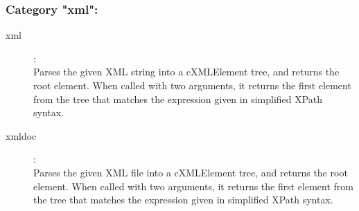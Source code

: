 \subsubsection{Category "xml":}
\label{sec:ned-functions:category-xml}

\begin{description}
\item[xml]:  \\
    Parses the given XML string into a cXMLElement tree, and returns the root element. When called with two arguments, it returns the first element from the tree that matches the expression given in simplified XPath syntax.
\item[xmldoc]:  \\
    Parses the given XML file into a cXMLElement tree, and returns the root element. When called with two arguments, it returns the first element from the tree that matches the expression given in simplified XPath syntax.
\end{description}

